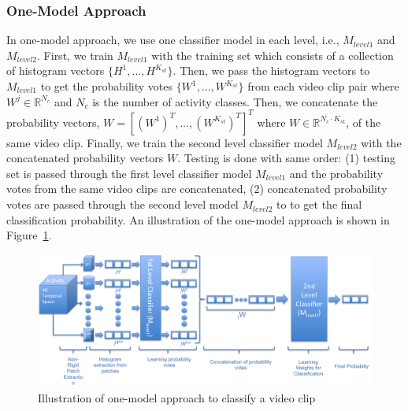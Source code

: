 \documentclass[a4paper, 10pt, conference]{ieeeconf}      %
\begin{document}
\subsubsection{One-Model Approach}
\label{section:OneModelApproach}
In one-model approach, we use one classifier model in each level, i.e., $M_{level1}$ and $M_{level2}$. First, we train $M_{level1}$ with the training set which consists of a collection of histogram vectors $\{H^{1}, ..., H^{K_{st}}\}$. Then, we pass the histogram vectors to $M_{level1}$ to get the probability votes $\{W^{1}, ..., W^{K_{st}}\}$ from each video clip pair where $W^{j} \in \mathbb{R}^{N_{c}}$ and $N_{c}$ is the number of activity classes. Then, we concatenate the probability vectors, $W = \left[(W^{1})^{T}, ..., (W^{K_{st}})^{T}\right]^{T}$ where $W \in \mathbb{R}^{N_{c} \cdot K_{st}}$, of the same video clip. Finally, we train the second level classifier model $M_{level2}$ with the concatenated probability vectors $W$. Testing is done with same order: (1) testing set is passed through the first level classifier model $M_{level1}$ and the probability votes from the same video clips are concatenated, (2) concatenated probability votes are passed through the second level model $M_{level2}$ to to get the final classification probability. An illustration of the one-model approach is shown in Figure~\ref{fig:oneModelApproachIllustration}.
    
\begin{figure}[!htbp]
\begin{center}
\includegraphics[scale=0.29]{Figures/oneModelApproach3}
\end{center}
\caption{Illustration of one-model approach to classify a video clip \label{fig:oneModelApproachIllustration}}
\end{figure}
\end{document}
